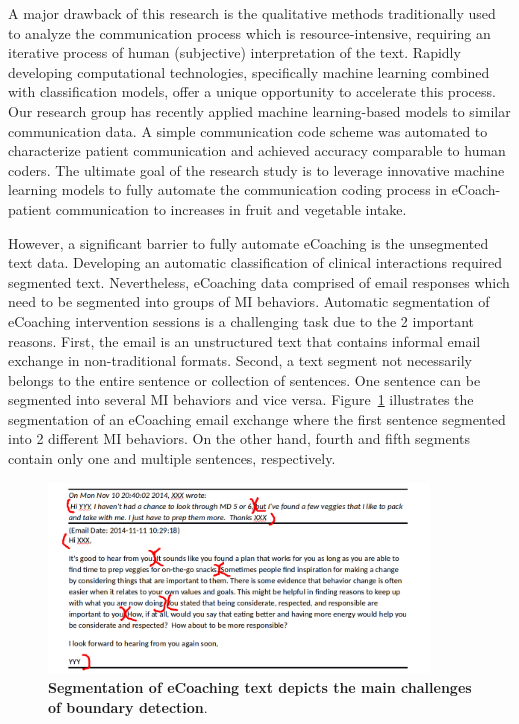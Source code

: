 \documentclass{amia}
\begin{document}
A major drawback of this research is the qualitative methods traditionally used to analyze the communication process which is resource-intensive, requiring an iterative process of human (subjective) interpretation of the text. Rapidly developing computational technologies, specifically machine learning combined with classification models, offer a unique opportunity to accelerate this process. Our research group has recently applied machine learning-based models to similar communication data\cite{hasan2016study,kotov2015interpretable}. A simple communication code scheme was automated to characterize patient communication and achieved accuracy comparable to human coders\cite{hasan2016study}. The ultimate goal of the research study is to leverage innovative machine learning models to fully automate the communication coding process in eCoach-patient communication to increases in fruit and vegetable intake. 

However, a significant barrier to fully automate eCoaching is the unsegmented text data. Developing an automatic classification of clinical interactions required segmented text. Nevertheless, eCoaching data comprised of email responses which need to be segmented into groups of MI behaviors. Automatic segmentation of eCoaching intervention sessions is a challenging task due to the 2 important reasons. First, the email is an unstructured text that contains informal email exchange in non-traditional formats. Second, a text segment not necessarily belongs to the entire sentence or collection of sentences. One sentence can be segmented into several MI behaviors and vice versa. Figure~\ref{fig:text-segment} illustrates the segmentation of an eCoaching email exchange where the first sentence segmented into 2 different MI behaviors. On the other hand, fourth and fifth segments contain only one and multiple sentences, respectively.  

\begin{figure}[!htb]
    \centering
    \includegraphics[width=0.9\textwidth]{figures/segment-example.png}
    \caption{\textbf{Segmentation of eCoaching text depicts the main challenges of boundary detection}.}
    \label{fig:text-segment}
\end{figure}
\end{document}
